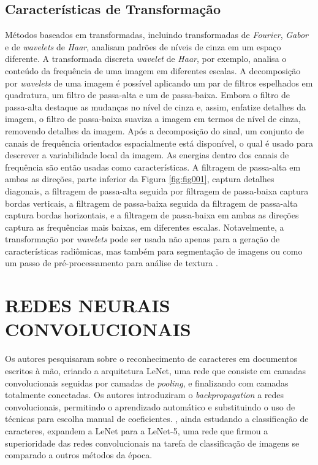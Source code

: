 \subsection{Características de Transformação}
Métodos baseados em transformadas, incluindo transformadas de \textit{Fourier}, \textit{Gabor} e de \textit{wavelets} de \textit{Haar}, analisam padrões de níveis de cinza em um espaço diferente. A transformada discreta \textit{wavelet} de \textit{Haar}, por exemplo, analisa o conteúdo da frequência de uma imagem em diferentes escalas. A decomposição por \textit{wavelets} de uma imagem é possível aplicando um par de filtros espelhados em quadratura, um filtro de passa-alta e um de passa-baixa. Embora o filtro de passa-alta destaque as mudanças no nível de cinza e, assim, enfatize detalhes da imagem, o filtro de passa-baixa suaviza a imagem em termos de nível de cinza, removendo detalhes da imagem. Após a decomposição do sinal, um conjunto de canais de frequência orientados espacialmente está disponível, o qual é usado para descrever a variabilidade local da imagem. As energias dentro dos canais de frequência são então usadas como características. A filtragem de passa-alta em ambas as direções, parte inferior da Figura \ref{fig:fig001}, captura detalhes diagonais, a filtragem de passa-alta seguida por filtragem de passa-baixa captura bordas verticais, a filtragem de passa-baixa seguida da filtragem de passa-alta captura bordas horizontais, e a filtragem de passa-baixa em ambas as direções captura as frequências mais baixas, em diferentes escalas. Notavelmente, a transformação por \textit{wavelets} pode ser usada não apenas para a geração de características radiômicas, mas também para segmentação de imagens ou como um passo de pré-processamento para análise de textura \cite{mayerhoeferIntroductionRadiomics2020}.

\section{REDES NEURAIS CONVOLUCIONAIS}
\label{sec:cnn}


Os autores  pesquisaram sobre o reconhecimento de caracteres em documentos escritos à mão, criando a arquitetura LeNet, uma rede que consiste em camadas convolucionais seguidas por camadas de \textit{pooling}, e finalizando com camadas totalmente conectadas. Os autores introduziram o \textit{backpropagation} a redes convolucionais, permitindo o aprendizado automático e substituindo o uso de técnicas para escolha manual de coeficientes. , ainda estudando a classificação de caracteres, expandem a LeNet para a LeNet-5, uma rede que firmou a superioridade das redes convolucionais na tarefa de classificação de imagens se comparado a outros métodos da época.

